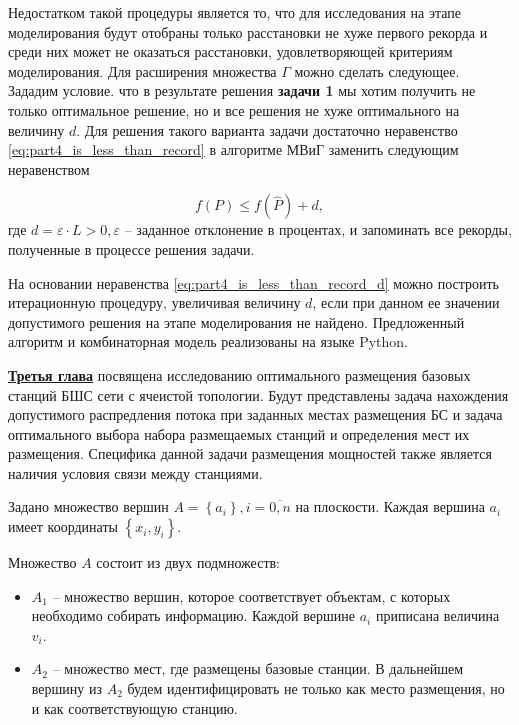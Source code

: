 Недостатком такой процедуры является то, что для исследования на этапе моделирования будут отобраны только расстановки не хуже первого рекорда и среди них может не оказаться расстановки, удовлетворяющей критериям моделирования.
Для расширения множества $\Gamma$ можно сделать следующее. Зададим условие. что в результате решения \textbf{задачи 1} мы хотим получить не только оптимальное решение, но и все решения не хуже оптимального на величину $d$. Для решения такого варианта задачи достаточно неравенство \cref{eq:part4_is_less_than_record} в алгоритме МВиГ заменить следующим неравенством 

\begin{equation}
    \label{eq:part4_is_less_than_record_d}
    f(P) \leqslant f(\widehat{P}) + d,
\end{equation}
где $d = \varepsilon \cdot L > 0, \varepsilon$ -- заданное отклонение в процентах, и запоминать все рекорды, полученные в процессе решения задачи.

На основании неравенства \cref{eq:part4_is_less_than_record_d} можно построить итерационную процедуру, увеличивая величину $d$, если при данном ее значении допустимого решения на этапе моделирования не найдено. Предложенный алгоритм и комбинаторная модель реализованы на языке Python.


\underline{\textbf{Третья глава}} посвящена исследованию оптимального размещения базовых станций БШС сети с ячеистой топологии. Будут представлены задача нахождения допустимого распредления потока при заданных местах размещения БС и задача оптимального выбора набора размещаемых стан­ций и определения мест их размещения. Специфика данной задачи размещения мощностей также является наличия условия связи между станциями.

Задано множество вершин $A= \left\{ a_i \right\}, i=\overline{0,n}$ на плоскости. Каждая вершина $a_i$ имеет координаты $\left\{ x_i, y_i \right\}$.

Множество $A$ состоит из двух подмножеств:
\begin{itemize}
    \item $A_1$ -- множество вершин, которое соответствует объектам, с которых необходимо собирать информацию. Каждой вершине $a_i$ приписана величина $v_i$.
    \item $A_2$ -- множество мест, где размещены базовые станции. В дальнейшем вершину из $A_2$ будем идентифицировать  не только как место размещения, но и как соответствующую станцию.
\end{itemize}

